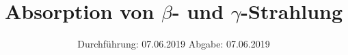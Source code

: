 

\subject{Nr. 704}
\title{\texorpdfstring{Absorption von $\beta$- und $\gamma$-Strahlung}{Absorption von Beta- und Gamma-Strahlung}}
\date{%
  Durchführung: 07.06.2019
  \hspace{3em}
  Abgabe: 07.06.2019
}



\maketitle
\thispagestyle{empty}
\tableofcontents
\newpage






\printbibliography{}


